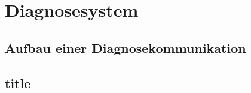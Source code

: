 \chapter{Diagnosesystem} \label{cha:Diagnosesystem}
\lipsum[1-1]
\section{Aufbau einer Diagnosekommunikation}
\section{title}